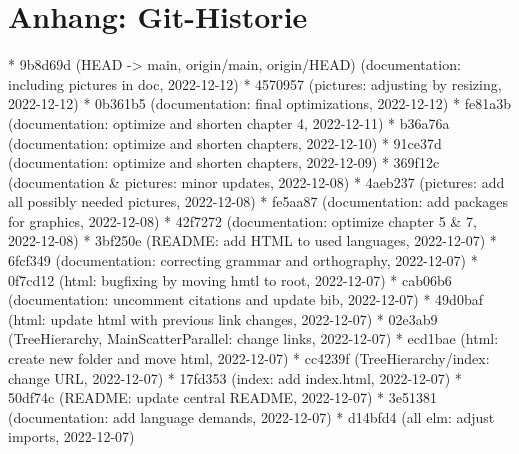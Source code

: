\documentclass[usegeometry=true]{scrartcl}
\begin{document}
\section*{Anhang: Git-Historie}
* 9b8d69d (HEAD -> main, origin/main, origin/HEAD) (documentation: including pictures in doc, 2022-12-12) \newline
* 4570957 (pictures: adjusting by resizing, 2022-12-12) \newline
* 0b361b5 (documentation: final optimizations, 2022-12-12)\newline
* fe81a3b (documentation: optimize and shorten chapter 4, 2022-12-11)\newline
* b36a76a (documentation: optimize and shorten chapters, 2022-12-10)\newline
* 91ce37d (documentation: optimize and shorten chapters, 2022-12-09)\newline
* 369f12c (documentation \& pictures: minor updates, 2022-12-08)\newline
* 4aeb237 (pictures: add all possibly needed pictures, 2022-12-08)\newline
* fe5aa87 (documentation: add packages for graphics, 2022-12-08)\newline
* 42f7272 (documentation: optimize chapter 5 \& 7, 2022-12-08)\newline
* 3bf250e (README: add HTML to used languages, 2022-12-07)\newline
* 6fcf349 (documentation: correcting grammar and orthography, 2022-12-07)\newline
* 0f7cd12 (html: bugfixing by moving hmtl to root, 2022-12-07)\newline
* cab06b6 (documentation: uncomment citations and update bib, 2022-12-07)\newline
* 49d0baf (html: update html with previous link changes, 2022-12-07)\newline
* 02e3ab9 (TreeHierarchy, MainScatterParallel: change links, 2022-12-07)\newline
* ecd1bae (html: create new folder and move html, 2022-12-07)\newline
* cc4239f (TreeHierarchy/index: change URL, 2022-12-07) \newline
* 17fd353 (index: add index.html, 2022-12-07)\newline
* 50df74c (README: update central README, 2022-12-07)\newline
* 3e51381 (documentation: add language demands, 2022-12-07)\newline
* d14bfd4 (all elm: adjust imports, 2022-12-07)\newline
\end{document}
